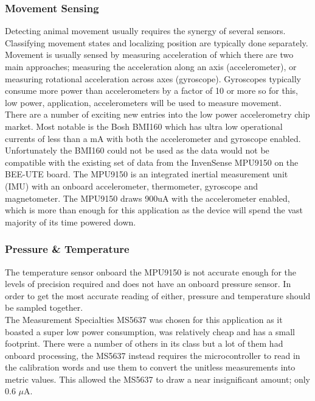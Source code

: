 \documentclass[12pt,openany,a4paper]{book}
\begin{document}
			\subsubsection{Movement Sensing}		
			Detecting animal movement usually requires the synergy of several sensors. Classifying movement states and localizing position are typically done separately. Movement is usually sensed by measuring acceleration of which there are two main approaches; measuring the acceleration along an axis (accelerometer), or measuring rotational acceleration across axes (gyroscope). Gyroscopes typically consume more power than accelerometers by a factor of 10 or more \cite{InvenMPU9150} so for this, low power, application, accelerometers will be used to measure movement. \\
						
			There are a number of exciting new entries into the low power accelerometry chip market. Most notable is the Bosh BMI160 \cite{bosch15} which has ultra low operational currents of less than a mA with both the accelerometer and gyroscope enabled. \\
			
			Unfortunately the BMI160 could not be used as the data would not be compatible with the existing set of data from the InvenSense MPU9150 \cite{InvenMPU9150} on the BEE-UTE board. The MPU9150 is an integrated inertial measurement unit (IMU) with an onboard accelerometer, thermometer, gyroscope and magnetometer. The MPU9150 draws 900uA with the accelerometer enabled, which is more than enough for this application as the device will spend the vast majority of its time powered down. 
			
			\subsubsection{Pressure \& Temperature}
			The temperature sensor onboard the MPU9150 is not accurate enough for the levels of precision required and does not have an onboard pressure sensor. In order to get the most accurate reading of either, pressure and temperature should be sampled together. \\
			
			The Measurement Specialties MS5637 \cite{MEASPRESSURE} was chosen for this application as it boasted a super low power consumption, was relatively cheap and has a small footprint. There were a number of others in its class but a lot of them had onboard processing, the MS5637 instead requires the microcontroller to read in the calibration words and use them to convert the unitless measurements into metric values. This allowed the MS5637 to draw a near insignificant amount; only 0.6 $\mu$A.
			
\end{document}
